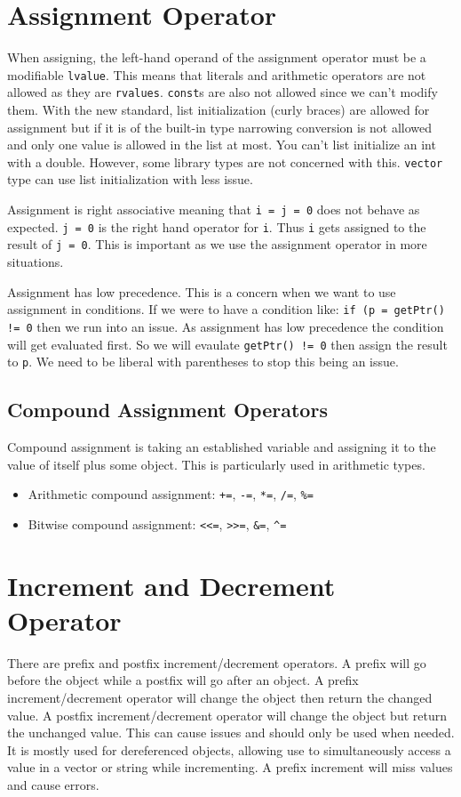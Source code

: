\documentclass[12pt, a4paper]{report}
\begin{document}
\section{Assignment Operator}
When assigning, the left-hand operand of the assignment operator must be a modifiable \verb|lvalue|.
This means that literals and arithmetic operators are not allowed as they are \verb|rvalues|.
\verb|const|s are also not allowed since we can't modify them.
With the new standard, list initialization (curly braces) are allowed for assignment but if it is of the built-in type narrowing
conversion is not allowed and only one value is allowed in the list at most.
You can't list initialize an int with a double.
However, some library types are not concerned with this.
\verb|vector| type can use list initialization with less issue.

Assignment is right associative meaning that \verb|i = j = 0| does not behave as expected.
\verb|j = 0| is the right hand operator for \verb|i|. 
Thus \verb|i| gets assigned to the result of \verb|j = 0|.
This is important as we use the assignment operator in more situations.

Assignment has low precedence.
This is a concern when we want to use assignment in conditions.
If we were to have a condition like: \verb|if (p = getPtr() != 0| then we run into an issue.
As assignment has low precedence the condition will get evaluated first.
So we will evaulate \verb|getPtr() != 0| then assign the result to \verb|p|.
We need to be liberal with parentheses to stop this being an issue.
\subsection{Compound Assignment Operators}
Compound assignment is taking an established variable and assigning it to the value of itself plus some object.
This is particularly used in arithmetic types.
\begin{itemize}
  \item Arithmetic compound assignment: \verb|+=|, \verb|-=|, \verb|*=|, \verb|/=|, \verb|%=|
  \item Bitwise compound assignment: \verb|<<=|, \verb|>>=|, \verb|&=|, \verb|^=|
\end{itemize}
\section{Increment and Decrement Operator}
There are prefix and postfix increment/decrement operators.
A prefix will go before the object while a postfix will go after an object.
A prefix increment/decrement operator will change the object then return the changed value.
A postfix increment/decrement operator will change the object but return the unchanged value.
This can cause issues and should only be used when needed.
It is mostly used for dereferenced objects, allowing use to simultaneously access a value in a vector or string while incrementing.
A prefix increment will miss values and cause errors.
\end{document}
